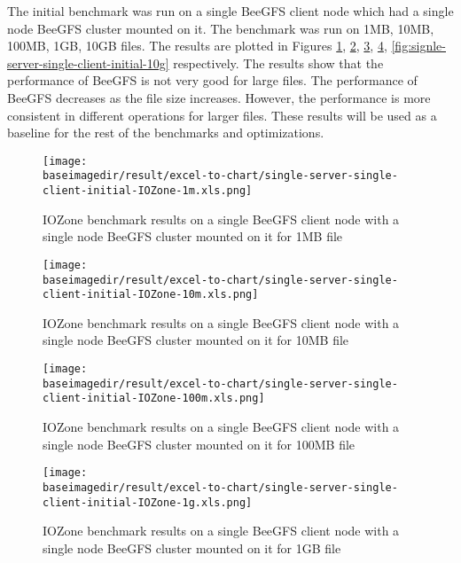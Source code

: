 \documentclass{article}
\newcommand{\baseimagedir}{..}
\begin{document}
The initial benchmark was run on a single BeeGFS client node which had a single node BeeGFS cluster mounted on it. The benchmark was run on 1MB, 10MB, 100MB, 1GB, 10GB files. The results are plotted in Figures \ref{fig:signle-server-single-client-initial-1m}, \ref{fig:signle-server-single-client-initial-10m}, \ref{fig:signle-server-single-client-initial-100m}, \ref{fig:signle-server-single-client-initial-1g}, \ref{fig:signle-server-single-client-initial-10g} respectively. The results show that the performance of BeeGFS is not very good for large files. The performance of BeeGFS decreases as the file size increases. However, the performance is more consistent in different operations for larger files. These results will be used as a baseline for the rest of the benchmarks and optimizations.

\begin{figure}
    \centering
    \texttt{[image: \\baseimagedir/result/excel-to-chart/single-server-single-client-initial-IOZone-1m.xls.png]}
    \caption{IOZone benchmark results on a single BeeGFS client node with a single node BeeGFS cluster mounted on it for 1MB file}
    \label{fig:signle-server-single-client-initial-1m}
\end{figure}

\begin{figure}
    \centering
    \texttt{[image: \\baseimagedir/result/excel-to-chart/single-server-single-client-initial-IOZone-10m.xls.png]}
    \caption{IOZone benchmark results on a single BeeGFS client node with a single node BeeGFS cluster mounted on it for 10MB file}
    \label{fig:signle-server-single-client-initial-10m}
\end{figure}

\begin{figure}
    \centering
    \texttt{[image: \\baseimagedir/result/excel-to-chart/single-server-single-client-initial-IOZone-100m.xls.png]}
    \caption{IOZone benchmark results on a single BeeGFS client node with a single node BeeGFS cluster mounted on it for 100MB file}
    \label{fig:signle-server-single-client-initial-100m}
\end{figure}

\begin{figure}
    \centering
    \texttt{[image: \\baseimagedir/result/excel-to-chart/single-server-single-client-initial-IOZone-1g.xls.png]}
    \caption{IOZone benchmark results on a single BeeGFS client node with a single node BeeGFS cluster mounted on it for 1GB file}
    \label{fig:signle-server-single-client-initial-1g}
\end{figure}
\end{document}
